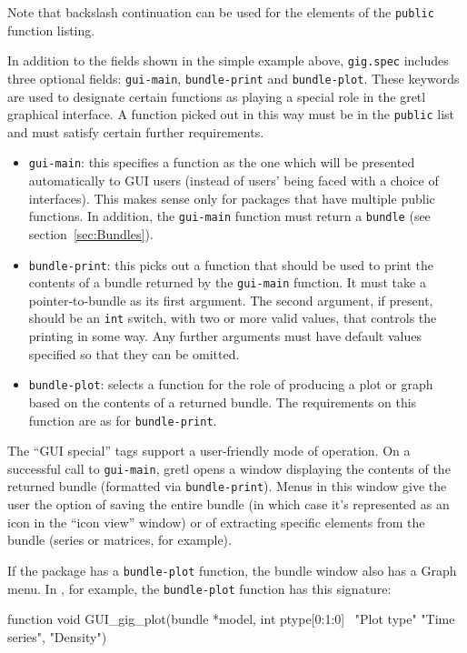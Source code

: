 Note that backslash continuation can be used for the elements of the
\texttt{public} function listing.

In addition to the fields shown in the simple example above,
\texttt{gig.spec} includes three optional fields: \texttt{gui-main},
\texttt{bundle-print} and \texttt{bundle-plot}. These keywords are
used to designate certain functions as playing a special role in the
gretl graphical interface. A function picked out in this way
must be in the \texttt{public} list and must satisfy certain
further requirements.  
%
\begin{itemize}
\item \texttt{gui-main}: this specifies a function as the one which
  will be presented automatically to GUI users (instead of users'
  being faced with a choice of interfaces). This makes sense only for
  packages that have multiple public functions. In addition, the
  \texttt{gui-main} function must return a \texttt{bundle} (see
  section~\ref{sec:Bundles}).
\item \texttt{bundle-print}: this picks out a function that should be
  used to print the contents of a bundle returned by the
  \texttt{gui-main} function. It must take a pointer-to-bundle as its
  first argument. The second argument, if present, should be an
  \texttt{int} switch, with two or more valid values, that controls the
  printing in some way. Any further arguments must have default values
  specified so that they can be omitted.
\item \texttt{bundle-plot}: selects a function for the role of
  producing a plot or graph based on the contents of a returned
  bundle. The requirements on this function are as for 
  \texttt{bundle-print}.
\end{itemize}

The ``GUI special'' tags support a user-friendly mode of operation.
On a successful call to \texttt{gui-main}, gretl opens a 
window displaying the contents of the returned bundle (formatted
via \texttt{bundle-print}). Menus in this window give the user the
option of saving the entire bundle (in which case it's represented
as an icon in the ``icon view'' window) or of extracting specific
elements from the bundle (series or matrices, for example). 

If the package has a \texttt{bundle-plot} function, the bundle window
also has a \textsf{Graph} menu. In , for example, the
\texttt{bundle-plot} function has this signature:
%
\begin{code}
function void GUI_gig_plot(bundle *model, int ptype[0:1:0] \
                           "Plot type" {"Time series", "Density"})
\end{code}

